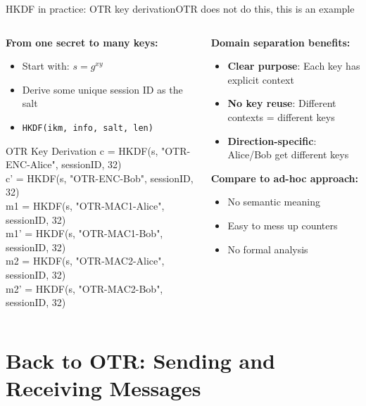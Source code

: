 \documentclass[aspectratio=169, lualatex, handout]{beamer}
\begin{document}
\begin{frame}{HKDF in practice: OTR key derivation}{OTR does not do this, this is an example}
	\begin{columns}[c]
		\begin{column}{0.5\textwidth}
			\textbf{From one secret to many keys:}
			\begin{itemize}
				\item Start with: $s = g^{xy}$
				\item Derive some unique session ID as the salt
				\item \texttt{HKDF(ikm, info, salt, len)}
			\end{itemize}
			\begin{exampleblock}{OTR Key Derivation}
				\ttfamily\scriptsize
				c = HKDF(s, "OTR-ENC-Alice", sessionID, 32)\\
				c' = HKDF(s, "OTR-ENC-Bob", sessionID, 32)\\
				m1 = HKDF(s, "OTR-MAC1-Alice", sessionID, 32)\\
				m1' = HKDF(s, "OTR-MAC1-Bob", sessionID, 32)\\
				m2 = HKDF(s, "OTR-MAC2-Alice", sessionID, 32)\\
				m2' = HKDF(s, "OTR-MAC2-Bob", sessionID, 32)
			\end{exampleblock}
		\end{column}
		\begin{column}{0.5\textwidth}
			\textbf{Domain separation benefits:}
			\begin{itemize}
				\item \textbf{Clear purpose}: Each key has explicit context
				\item \textbf{No key reuse}: Different contexts = different keys
				\item \textbf{Direction-specific}: Alice/Bob get different keys
			\end{itemize}
			\textbf{Compare to ad-hoc approach:}
			\begin{itemize}
				\item No semantic meaning
				\item Easy to mess up counters
				\item No formal analysis
			\end{itemize}
		\end{column}
	\end{columns}
\end{frame}

\section{Back to OTR: Sending and Receiving Messages}
\end{document}
